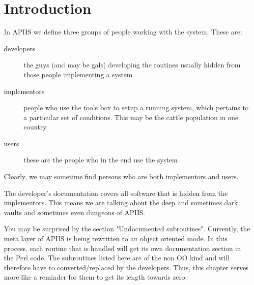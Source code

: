 \chapter{Introduction}
In APIIS we define three groups of people working with the system. These
are:
\begin{description}
   \item[developers]the guys (and may be gals) developing the routines
   usually hidden from those people implementing a system
   \item[implementors]people who use the tools box to setup a running
   system, which pertains to a particular set of conditions. This may be
   the cattle population in one country
   \item[users]these are the people who in the end use the system
\end{description}
Clearly, we may sometime find persons who are both implementors and users. 

The developer's documentation covers all software  that is hidden from the
implementors. This means we are talking about the deep and sometimes dark
vaults and sometimes even dungeons of APIIS.

You may be surprised by the section "Undocumented subroutines". Currently,
   the meta layer of APIIS is being rewritten to an object oriented mode. 
   In this process, each routine that is handled will get its own
   documentation section in the Perl code. The subroutines listed here are
   of the non OO kind and will therefore have to converted/replaced by the
   developers. Thus, this chapter serves more like a reminder for them to
   get its length towards zero.
